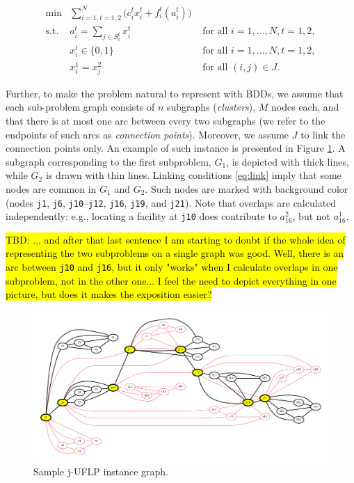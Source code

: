 \documentclass[11pt]{article}
\begin{document}
\begin{subequations}\label{eq:j-UFLP}
\begin{align}
  \min & \sum_{i=1, t=1,2}^N \Big(c^t_i x^t_i + f^t_i(a^t_i)\Big)&\\
    \textrm{s.t. } & a^t_i = \sum_{j\in S^t_i} x^t_i& \textrm{ for all } i=1,\ldots, N, t=1,2,\\
    & x^t_i\in\{0,1\} & \textrm{ for all } i=1,\ldots,N, t=1,2,\\
    & x^1_i = x^2_j & \textrm{ for all } (i,j)\in J.\label{eq:link}
\end{align}
\end{subequations}

Further, to make the problem natural to represent with BDDs, we assume that each
sub-problem graph consists of \(n\) subgraphs (\emph{clusters}), \(M\) nodes each, and
that there is at most one arc between every two subgraphs (we refer to the
endpoints of such arcs as \emph{connection points}). Moreover, we assume \(J\) to link
the connection points only. An example of such instance is presented in Figure
\ref{fig:sample-jUFLP}. A subgraph corresponding to the first subproblem, \(G_1\),
is depicted with thick lines, while \(G_2\) is drawn with thin lines. Linking
conditions \eqref{eq:link} imply that some nodes are common in \(G_1\) and \(G_2\).
Such nodes are marked with background color (nodes \texttt{j1}, \texttt{j6}, \texttt{j10}--\texttt{j12},
\texttt{j16}, \texttt{j19}, and \texttt{j21}). Note that overlaps are calculated independently: e.g.,
locating a facility at \texttt{j10} does contribute to \(a_{16}^2\), but not \(a_{16}^1\).

\hl{TBD: ... and after that last sentence I am starting to doubt if
the whole idea of representing the two subproblems on a single graph was good.
Well, there is an arc between \texttt{j10} and \texttt{j16}, but it only "works" when I calculate
overlaps in one subproblem, not in the other one... I feel the need to depict everything in one picture,
but does it makes the exposition easier?}


  \begin{figure}%
    \centering
    \includegraphics[width=\textwidth]{./sample_jUFLP.pdf}%
    \caption{Sample j-UFLP instance graph.}%
    \label{fig:sample-jUFLP}%
\end{figure}
\end{document}
